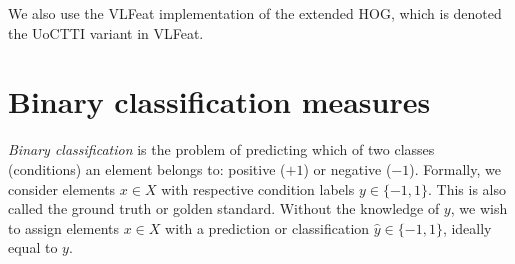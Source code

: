 \documentclass[thesis.tex]{subfiles}
\begin{document}
We also use the VLFeat implementation of the extended HOG, which is denoted the UoCTTI variant in VLFeat.
%
%

%
\section{Binary classification measures}
\label{sec:binaryClassificationMeasures}
%
\emph{Binary classification} is the problem of predicting which of two classes (conditions) an element belongs to: positive ($+1$) or negative ($-1$). Formally, we consider elements $x \in X$ with respective condition labels $y \in \{-1, 1\}$. This is also called the ground truth or golden standard. Without the knowledge of $y$, we wish to assign elements $x \in X$ with a prediction or classification $\hat{y} \in \{-1, 1\}$, ideally equal to $y$.
\end{document}
